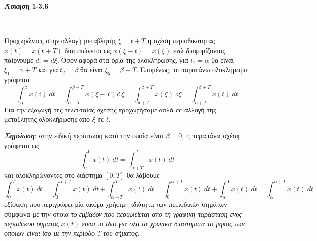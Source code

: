 \documentclass[a4paper,twoside,10pt,openany]{memoir}
\theoremstyle{dotless}
\newcounter{problem}[section] %
\begin{document}
\pagestyle{empty}


\paragraph {Άσκηση 1-3.6}~\medskip


\begin{solution}
Προχωρώντας στην αλλαγή μεταβλητής $\xi=t+T$ η σχέση περιοδικότητας $x(t)=x(t+T)$ διατυπώνεται ως $x(\xi-t)=x(\xi)$ ενώ διαφορίζοντας παίρνουμε $dt=d\xi$. Όσον αφορά στα όρια της ολοκλήρωσης, για $t_1=\alpha$ θα είναι $\xi_1=\alpha+T$ και για $t_2=\beta$ θα είναι $\xi_2=\beta+T$. Επομένως, το παραπάνω ολοκλήρωμα γράφεται
\begin{equation*}
\int_{\alpha}^{\beta}\!\!\!x(t)\:dt=\int_{\alpha+T}^{\beta+T}\!\!\!x(\xi-T)d\:\xi=
\int_{\alpha+T}^{\beta+T}\!\!\!x(\xi)\:d\xi=\int_{\alpha+T}^{\beta+T}\!\!\!x(t)\:dt
\end{equation*}
Για την εξαγωγή της τελευταίας σχέσης προχωρήσαμε απλά σε αλλαγή της μεταβλητής ολοκλήρωσης από $\xi$ σε $t$.\medskip

\noindent \emph {\textbf {Σημείωση}}: στην ειδική περίπτωση κατά την οποία είναι $\beta=0$, η παραπάνω σχέση γράφεται ως
\begin{equation*}
\int_{\alpha}^{0}x(t)\:dt=\int_{\alpha+T}^{T}\!\!\!x(t)\:dt
\end{equation*}
και ολοκληρώνοντας στο διάστημα $[0,T]$ θα λάβουμε
\begin{equation*}
\int_{0}^{T}x(t)\:dt=\int_{0}^{\alpha+T}\!\!\!x(t)\:dt+\int_{\alpha+T}^{T}\!\!\!x(t)\:dt=
\int_{0}^{\alpha+T}\!\!\!x(t)\:dt+\int_{\alpha}^{0}\!\!\!x(t)\:dt=\int_{\alpha}^{\alpha+T}\!\!\!x(t)\:dt
\end{equation*}
εξίσωση που περιγράφει μία ακόμα χρήσιμη ιδιότητα των περιοδικών σημάτων σύμφωνα με την οποία \emph {το εμβαδόν που περικλείεται από τη γραφική παράσταση ενός περιοδικού σήματος $x(t)$ είναι το ίδιο για όλα τα χρονικά διαστήματα το μήκος των οποίων είναι ίσο με την περίοδο $T$ του σήματος}.
\end{solution}
\end{document}
